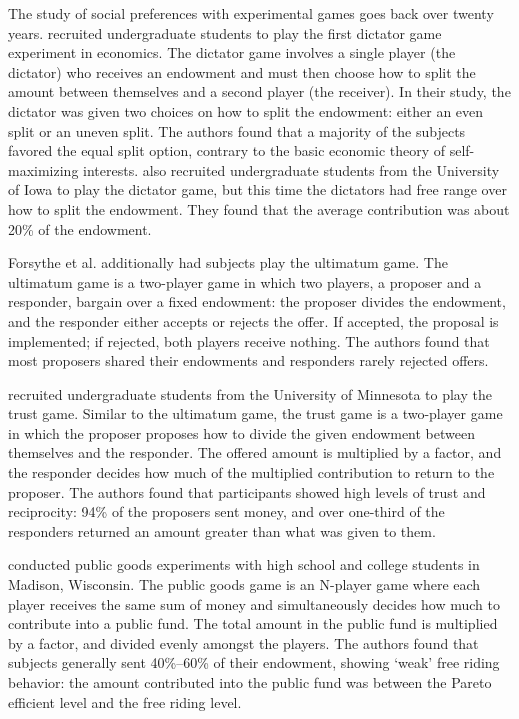 \documentclass[12pt]{article}
\begin{document}
The study of social preferences with experimental games goes back over twenty years. \cite{kahneman_1986} recruited undergraduate students to play the first dictator game experiment in economics. The dictator game involves a single player (the dictator) who receives an endowment and must then choose how to split the amount between themselves and a second player (the receiver). In their study, the dictator was given two choices on how to split the endowment: either an even split or an uneven split. The authors found that a majority of the subjects favored the equal split option, contrary to the basic economic theory of self-maximizing interests. \cite{forsythe_1994} also recruited undergraduate students from the University of Iowa to play the dictator game, but this time the dictators had free range over how to split the endowment. They found that the average contribution was about 20\% of the endowment.

Forsythe et al. additionally had subjects play the ultimatum game. The ultimatum game is a two-player game in which two players, a proposer and a responder, bargain over a fixed endowment: the proposer divides the endowment, and the responder either accepts or rejects the offer. If accepted, the proposal is implemented; if rejected, both players receive nothing. The authors found that
most proposers shared their endowments and responders rarely rejected offers.

\cite{berg_1995} recruited undergraduate students from the University of Minnesota to play the trust game. Similar to the ultimatum game, the trust game is a two-player game in which the proposer proposes how to divide the given endowment between themselves and the responder. The offered amount is multiplied by a factor, and the responder decides how much of the multiplied contribution to return to the proposer. The authors found that participants showed high levels of trust and reciprocity: 94\% of the proposers sent money, and over one-third of the responders returned an amount greater than what was given to them.

\cite{marwell_1981} conducted public goods experiments with high school and college students in Madison, Wisconsin. The public goods game is an N-player game where each player receives the same sum of money and simultaneously decides how much to contribute into a public fund. The total amount in the public fund is multiplied by a factor, and divided evenly amongst the players. The authors found that subjects generally sent 40\%--60\% of their endowment, showing `weak' free riding behavior: the amount contributed into the public fund was between the Pareto efficient level and the free riding level.
\end{document}
